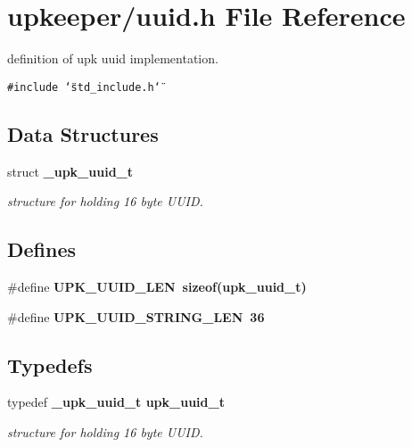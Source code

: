 \section{upkeeper/uuid.h File Reference}
\label{uuid_8h}
definition of upk uuid implementation. 

{\tt \#include \char`\"{}std\_\-include.h\char`\"{}}\par
\subsection*{Data Structures}
\begin{CompactItemize}
\item 
struct \bf{\_\-upk\_\-uuid\_\-t}
\begin{CompactList}\small\item\em structure for holding 16 byte UUID. \item\end{CompactList}\end{CompactItemize}
\subsection*{Defines}
\begin{CompactItemize}
\item 
\#define \bf{UPK\_\-UUID\_\-LEN}~sizeof(\bf{upk\_\-uuid\_\-t})
\item 
\#define \bf{UPK\_\-UUID\_\-STRING\_\-LEN}~36
\end{CompactItemize}
\subsection*{Typedefs}
\begin{CompactItemize}
\item 
typedef \bf{\_\-upk\_\-uuid\_\-t} \bf{upk\_\-uuid\_\-t}
\begin{CompactList}\small\item\em structure for holding 16 byte UUID. \item\end{CompactList}\end{CompactItemize}
